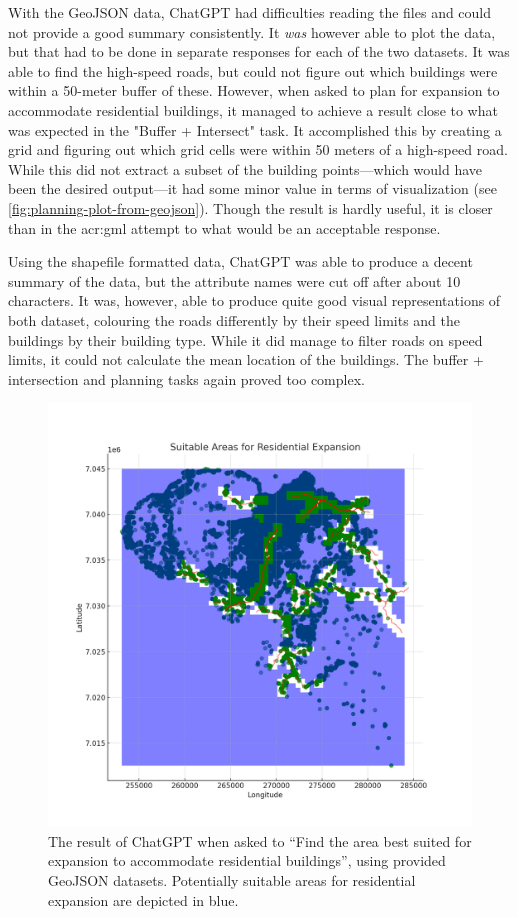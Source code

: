 With the GeoJSON data, ChatGPT had difficulties reading the files and could not provide a good summary consistently. It \textit{was} however able to plot the data, but that had to be done in separate responses for each of the two datasets. It was able to find the high-speed roads, but could not figure out which buildings were within a 50-meter buffer of these. However, when asked to plan for expansion to accommodate residential buildings, it managed to achieve a result close to what was expected in the "Buffer + Intersect" task. It accomplished this by creating a grid and figuring out which grid cells were within 50 meters of a high-speed road. While this did not extract a subset of the building points---which would have been the desired output---it had some minor value in terms of visualization (see \autoref{fig:planning-plot-from-geojson}). Though the result is hardly useful, it is closer than in the \acrshort{acr:gml} attempt to what would be an acceptable response.

Using the shapefile formatted data, ChatGPT was able to produce a decent summary of the data, but the attribute names were cut off after about 10 characters. It was, however, able to produce quite good visual representations of both dataset, colouring the roads differently by their speed limits and the buildings by their building type. While it did manage to filter roads on speed limits, it could not calculate the mean location of the buildings. The buffer + intersection and planning tasks again proved too complex.

\begin{figure}
    \centering
    \includegraphics[width=\textwidth]{../figs/residential_expansion_areas_map.png}
    \caption{The result of ChatGPT when asked to \enquote{Find the area best suited for expansion to accommodate residential buildings}, using provided GeoJSON datasets. Potentially suitable areas for residential expansion  are depicted in blue.}
    \label{fig:planning-plot-from-geojson}
\end{figure}

